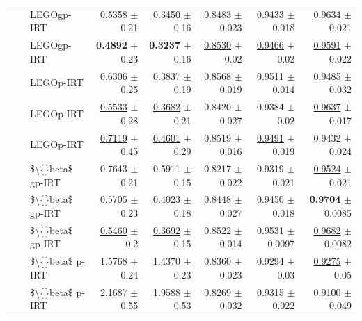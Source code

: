 \begin{longtable}{llp{}rrrrr}
 &  & LEGOgp-IRT & \underline{0.5358} {\scriptsize $\pm$ 0.21} & \underline{0.3450} {\scriptsize $\pm$ 0.16} & \underline{0.8483} {\scriptsize $\pm$ 0.023} & 0.9433 {\scriptsize $\pm$ 0.018} & \underline{0.9634} {\scriptsize $\pm$ 0.021} \\
 &  & LEGOgp-IRT & \textbf{0.4892} {\scriptsize $\pm$ 0.23} & \textbf{0.3237} {\scriptsize $\pm$ 0.16} & \underline{0.8530} {\scriptsize $\pm$ 0.02} & \underline{0.9466} {\scriptsize $\pm$ 0.02} & \underline{0.9591} {\scriptsize $\pm$ 0.022} \\
 &  & LEGOp-IRT & \underline{0.6306} {\scriptsize $\pm$ 0.25} & \underline{0.3837} {\scriptsize $\pm$ 0.19} & \underline{0.8568} {\scriptsize $\pm$ 0.019} & \underline{0.9511} {\scriptsize $\pm$ 0.014} & \underline{0.9485} {\scriptsize $\pm$ 0.032} \\
 &  & LEGOp-IRT & \underline{0.5533} {\scriptsize $\pm$ 0.28} & \underline{0.3682} {\scriptsize $\pm$ 0.21} & 0.8420 {\scriptsize $\pm$ 0.027} & 0.9384 {\scriptsize $\pm$ 0.02} & \underline{0.9637} {\scriptsize $\pm$ 0.017} \\
 &  & LEGOp-IRT & \underline{0.7119} {\scriptsize $\pm$ 0.45} & \underline{0.4601} {\scriptsize $\pm$ 0.29} & 0.8519 {\scriptsize $\pm$ 0.016} & \underline{0.9491} {\scriptsize $\pm$ 0.019} & 0.9432 {\scriptsize $\pm$ 0.024} \\
 &  & \$\textbackslash\{\}beta\$ gp-IRT & 0.7643 {\scriptsize $\pm$ 0.21} & 0.5911 {\scriptsize $\pm$ 0.15} & 0.8217 {\scriptsize $\pm$ 0.022} & 0.9319 {\scriptsize $\pm$ 0.021} & \underline{0.9524} {\scriptsize $\pm$ 0.021} \\
 &  & \$\textbackslash\{\}beta\$ gp-IRT & \underline{0.5705} {\scriptsize $\pm$ 0.23} & \underline{0.4023} {\scriptsize $\pm$ 0.18} & \underline{0.8448} {\scriptsize $\pm$ 0.027} & 0.9450 {\scriptsize $\pm$ 0.018} & \textbf{0.9704} {\scriptsize $\pm$ 0.0085} \\
 &  & \$\textbackslash\{\}beta\$ gp-IRT & \underline{0.5460} {\scriptsize $\pm$ 0.2} & \underline{0.3692} {\scriptsize $\pm$ 0.15} & 0.8522 {\scriptsize $\pm$ 0.014} & 0.9531 {\scriptsize $\pm$ 0.0097} & \underline{0.9682} {\scriptsize $\pm$ 0.0082} \\
 &  & \$\textbackslash\{\}beta\$ p-IRT & 1.5768 {\scriptsize $\pm$ 0.24} & 1.4370 {\scriptsize $\pm$ 0.23} & 0.8360 {\scriptsize $\pm$ 0.023} & 0.9294 {\scriptsize $\pm$ 0.03} & \underline{0.9275} {\scriptsize $\pm$ 0.05} \\
 &  & \$\textbackslash\{\}beta\$ p-IRT & 2.1687 {\scriptsize $\pm$ 0.55} & 1.9588 {\scriptsize $\pm$ 0.53} & 0.8269 {\scriptsize $\pm$ 0.032} & 0.9315 {\scriptsize $\pm$ 0.022} & 0.9100 {\scriptsize $\pm$ 0.049} \\

\end{longtable}
